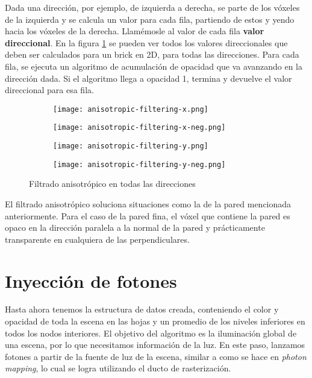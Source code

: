 Dada una dirección, por ejemplo, de izquierda a derecha, se parte de los vóxeles de la izquierda y se calcula un valor para cada fila, partiendo de estos y yendo hacia los vóxeles de la derecha.
Llamémosle al valor de cada fila \textbf{valor direccional}.
En la figura \ref{fig:svo_filtering_anisotropic} se pueden ver todos los valores direccionales que deben ser calculados para un brick en 2D, para todas las direcciones.
Para cada fila, se ejecuta un algoritmo de acumulación de opacidad que va avanzando en la dirección dada.
Si el algoritmo llega a opacidad 1, termina y devuelve el valor direccional para esa fila.

\begin{figure}
    \begin{center}
        \begin{subfigure}{.24\textwidth}
            \texttt{[image: anisotropic-filtering-x.png]}
        \end{subfigure}
        \begin{subfigure}{.24\textwidth}
            \texttt{[image: anisotropic-filtering-x-neg.png]}
        \end{subfigure}
        \begin{subfigure}{.24\textwidth}
            \texttt{[image: anisotropic-filtering-y.png]}
        \end{subfigure}
        \begin{subfigure}{.24\textwidth}
            \texttt{[image: anisotropic-filtering-y-neg.png]}
        \end{subfigure}
    \end{center}
    \caption{Filtrado anisotrópico en todas las direcciones}
    \label{fig:svo_filtering_anisotropic}
\end{figure}

El filtrado anisotrópico soluciona situaciones como la de la pared mencionada anteriormente.
Para el caso de la pared fina, el vóxel que contiene la pared es opaco en la dirección paralela a la normal de la pared y prácticamente transparente en cualquiera de las perpendiculares.

\section{Inyección de fotones}\label{sec:photon-injection}

Hasta ahora tenemos la estructura de datos creada, conteniendo el color y opacidad de toda la escena en las hojas y un promedio de los niveles inferiores en todos los nodos interiores.
El objetivo del algoritmo es la iluminación global de una escena, por lo que necesitamos información de la luz.
En este paso, lanzamos fotones a partir de la fuente de luz de la escena, similar a como se hace en \textit{photon mapping}, lo cual se logra utilizando el ducto de rasterización.

